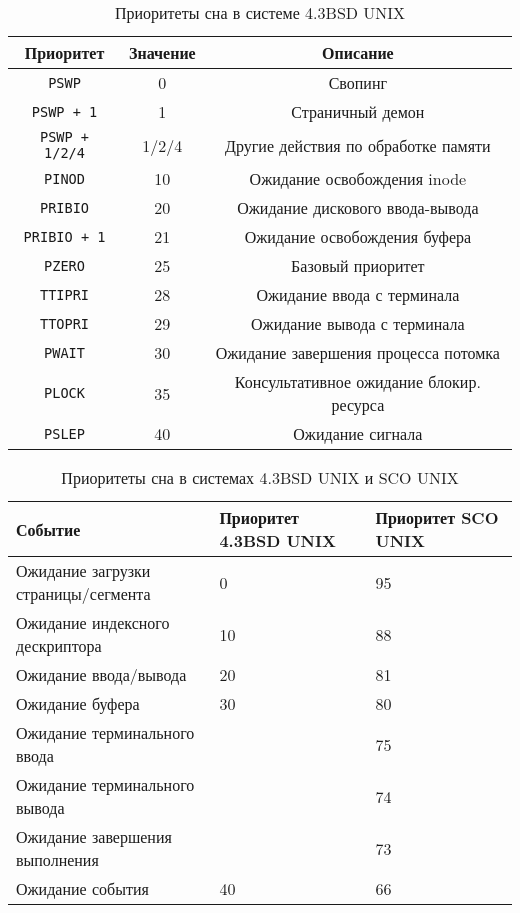 \newpage
\begin{table}[h]
	\caption{Приоритеты сна в системе 4.3BSD UNIX}
	\label{tab:bsd}
	\begin{center}
		\begin{tabular}{ |c|c|c|  }
			\hline
			\textbf{Приоритет} & \textbf{Значение} & \textbf{Описание} \\
			\hline
			\texttt{PSWP} & 0 & Свопинг \\
			\hline
			\texttt{PSWP + 1} & 1 & Страничный демон \\
			\hline
			\texttt{PSWP + 1/2/4} & 1/2/4 & Другие действия по обработке памяти \\
			\hline
			\texttt{PINOD} & 10 & Ожидание освобождения inode \\
			\hline
			\texttt{PRIBIO} & 20 & Ожидание дискового ввода-вывода \\
			\hline
			\texttt{PRIBIO + 1} & 21 & Ожидание освобождения буфера \\
			\hline
			\texttt{PZERO} & 25 & Базовый приоритет \\
			\hline
			\texttt{TTIPRI} & 28 & Ожидание ввода с терминала \\
			\hline
			\texttt{TTOPRI} & 29 & Ожидание вывода с терминала \\
			\hline 
			\texttt{PWAIT} & 30 & Ожидание завершения процесса потомка \\
			\hline
			\texttt{PLOCK} & 35 & Консультативное ожидание блокир. ресурса \\
			\hline
			\texttt{PSLEP} & 40 & Ожидание сигнала \\
			\hline
		\end{tabular}
	\end{center}
\end{table}

\begin{table}[h]
	\caption{Приоритеты сна в системах 4.3BSD UNIX и SCO UNIX}
	\begin{center}
		\begin{tabular}{|l|p{75pt}|p{75pt}|} 
			\hline
			\textbf{Событие} & \textbf{Приоритет 4.3BSD UNIX} & \textbf{Приоритет SCO UNIX}\\
			\hline
			{Ожидание загрузки страницы/сегмента} & 0 & 95\\
			\hline
			{Ожидание индексного дескриптора} & 10 & 88\\
			\hline
			{Ожидание ввода/вывода} & 20 & 81 \\
			\hline
			{Ожидание буфера} & 30 & 80\\
			\hline
			{Ожидание терминального ввода} &    & 75\\
			\hline
			{Ожидание терминального вывода} &    & 74\\
			\hline
			{Ожидание завершения выполнения} &    & 73\\
			\hline
			{Ожидание события} & 40 & 66\\
			\hline
		\end{tabular}
	\end{center}
	\label{tbl:sleeppriority}
\end{table}


